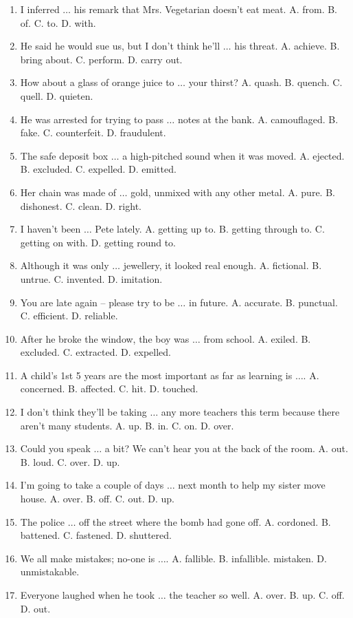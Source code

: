 \documentclass{article}
\numberwithin{equation}{section}
\begin{document}
\begin{enumerate}[leftmargin=2mm]
	\item I inferred $\ldots$ his remark that Mrs. Vegetarian doesn't eat meat. A. from. B. of. C. to. D. with.
	\item He said he would sue us, but I don't think he'll $\ldots$ his threat. A. achieve. B. bring about. C. perform. D. carry out.
	\item How about a glass of orange juice to $\ldots$ your thirst? A. quash. B. quench. C. quell. D. quieten.
	\item He was arrested for trying to pass $\ldots$ notes at the bank. A. camouflaged. B. fake. C. counterfeit. D. fraudulent.
	\item The safe deposit box $\ldots$ a high-pitched sound when it was moved. A. ejected. B. excluded. C. expelled. D. emitted.
	\item Her chain was made of $\ldots$ gold, unmixed with any other metal. A. pure. B. dishonest. C. clean. D. right.
	\item I haven't been $\ldots$ Pete lately. A. getting up  to. B. getting through to. C. getting on with. D. getting round to.
	\item Although it was only $\ldots$ jewellery, it looked real enough. A. fictional. B. untrue. C. invented. D. imitation.
	\item You are late again -- please try to be $\ldots$ in future. A. accurate. B. punctual. C. efficient. D. reliable.
	\item After he broke the window, the boy was $\ldots$ from school. A. exiled. B. excluded. C. extracted. D. expelled.
	\item A child's 1st 5 years are the most important as far as learning is $\ldots$. A. concerned. B. affected. C. hit. D. touched.
	\item I don't think they'll be taking $\ldots$ any more teachers this term because there aren't many students. A. up. B. in. C. on. D. over.
	\item Could you speak $\ldots$ a bit? We can't hear you at the back of the room. A. out. B. loud. C. over. D. up.
	\item I'm going to take a couple of days $\ldots$ next month to help my sister move house. A. over. B. off. C. out. D. up.
	\item The police $\ldots$ off the street where the bomb had gone off. A. cordoned. B. battened. C. fastened. D. shuttered.
	\item We all make mistakes; no-one is $\ldots$. A. fallible. B. infallible. mistaken. D. unmistakable.
	\item Everyone laughed when he took $\ldots$ the teacher so well. A. over. B. up. C. off. D. out.

\end{enumerate}
\end{document}
